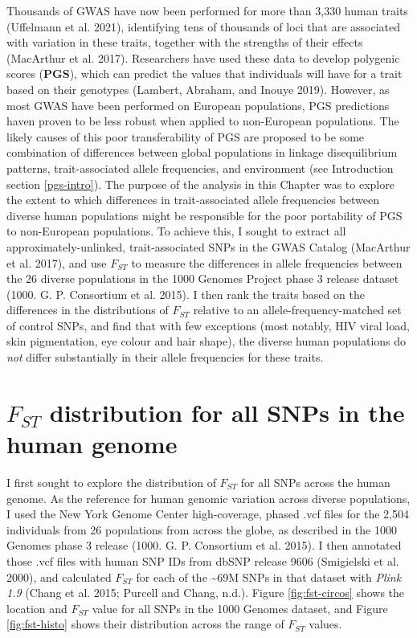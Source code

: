 \documentclass[
]{book}
\begin{document}
Thousands of GWAS have now been performed for more than 3,330 human traits (Uffelmann et al. 2021), identifying tens of thousands of loci that are associated with variation in these traits, together with the strengths of their effects (MacArthur et al. 2017). Researchers have used these data to develop polygenic scores (\textbf{PGS}), which can predict the values that individuals will have for a trait based on their genotypes (Lambert, Abraham, and Inouye 2019). However, as most GWAS have been performed on European populations, PGS predictions haven proven to be less robust when applied to non-European populations. The likely causes of this poor transferability of PGS are proposed to be some combination of differences between global populations in linkage disequilibrium patterns, trait-associated allele frequencies, and environment (see Introduction section \ref{pgs-intro}).
The purpose of the analysis in this Chapter was to explore the extent to which differences in trait-associated allele frequencies between diverse human populations might be responsible for the poor portability of PGS to non-European populations. To achieve this, I sought to extract all approximately-unlinked, trait-associated SNPs in the GWAS Catalog (MacArthur et al. 2017), and use \(F_{ST}\) to measure the differences in allele frequencies between the 26 diverse populations in the 1000 Genomes Project phase 3 release dataset (1000. G. P. Consortium et al. 2015). I then rank the traits based on the differences in the distributions of \(F_{ST}\) relative to an allele-frequency-matched set of control SNPs, and find that with few exceptions (most notably, HIV viral load, skin pigmentation, eye colour and hair shape), the diverse human populations do \emph{not} differ substantially in their allele frequencies for these traits.

\hypertarget{f_st-distribution-for-all-snps-in-the-human-genome}{%
\section{\texorpdfstring{\(F_{ST}\) distribution for all SNPs in the human genome}{F\_\{ST\} distribution for all SNPs in the human genome}}\label{f_st-distribution-for-all-snps-in-the-human-genome}}

I first sought to explore the distribution of \(F_{ST}\) for all SNPs across the human genome. As the reference for human genomic variation across diverse populations, I used the New York Genome Center high-coverage, phased .vcf files for the 2,504 individuals from 26 populations from across the globe, as described in the 1000 Genomes phase 3 release (1000. G. P. Consortium et al. 2015). I then annotated those .vcf files with human SNP IDs from dbSNP release 9606 (Smigielski et al. 2000), and calculated \(F_{ST}\) for each of the \textasciitilde69M SNPs in that dataset with \emph{Plink 1.9} (Chang et al. 2015; Purcell and Chang, n.d.). Figure \ref{fig:fst-circos} shows the location and \(F_{ST}\) value for all SNPs in the 1000 Genomes dataset, and Figure \ref{fig:fst-histo} shows their distribution across the range of \(F_{ST}\) values.
\end{document}
